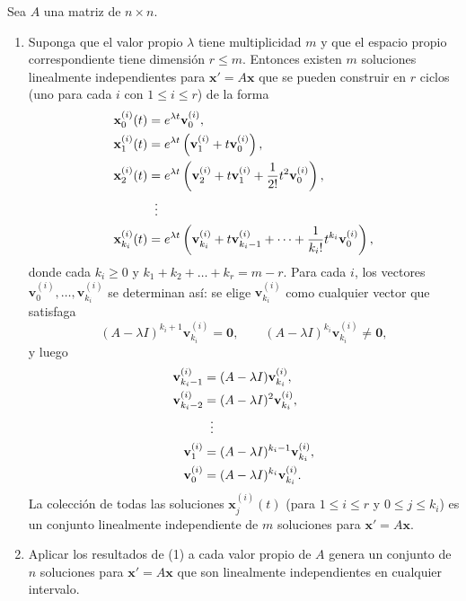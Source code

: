 \begin{theorem}\label{thm:ciclos}
Sea $A$ una matriz de $n \times n$.

\begin{enumerate}
    \item Suponga que el valor propio $\lambda$ tiene multiplicidad $m$ y que el espacio propio correspondiente tiene dimensi\'on $r \le m$. Entonces existen $m$ soluciones linealmente independientes para $\mathbf{x}' = A\mathbf{x}$ que se pueden construir en $r$ ciclos (uno para cada $i$ con $1 \le i \le r$) de la forma
    \begin{align}
    \mathbf{x}_0^{(i)}(t) &= e^{\lambda t}\mathbf{v}_0^{(i)}, \notag \\
    \mathbf{x}_1^{(i)}(t) &= e^{\lambda t}\left(\mathbf{v}_1^{(i)} + t\mathbf{v}_0^{(i)}\right), \notag \\
    \mathbf{x}_2^{(i)}(t) &= e^{\lambda t}\left(\mathbf{v}_2^{(i)} + t\mathbf{v}_1^{(i)} + \frac{1}{2!}t^2\mathbf{v}_0^{(i)}\right), \notag \\
    &\;\;\vdots \notag \\
    \mathbf{x}_{k_i}^{(i)}(t) &= e^{\lambda t}\left(\mathbf{v}_{k_i}^{(i)} + t\mathbf{v}_{k_i - 1}^{(i)} + \dots + \frac{1}{k_i!}t^{k_i}\mathbf{v}_0^{(i)}\right), \label{eq:ciclo-sol}
    \end{align}
    donde cada $k_i \ge 0$ y $k_1 + k_2 + \dots + k_r = m - r$. Para cada $i$, los vectores $\mathbf{v}_0^{(i)}, \dots, \mathbf{v}_{k_i}^{(i)}$ se determinan as\'i: se elige $\mathbf{v}_{k_i}^{(i)}$ como cualquier vector que satisfaga
    \begin{equation}\label{eq:ciclo-cond}
    (A - \lambda I)^{k_i + 1}\mathbf{v}_{k_i}^{(i)} = \mathbf{0}, \qquad (A - \lambda I)^{k_i}\mathbf{v}_{k_i}^{(i)} \neq \mathbf{0},
    \end{equation}
    y luego
    \begin{align}
    \mathbf{v}_{k_i - 1}^{(i)} &= (A - \lambda I)\mathbf{v}_{k_i}^{(i)}, \notag \\
    \mathbf{v}_{k_i - 2}^{(i)} &= (A - \lambda I)^2\mathbf{v}_{k_i}^{(i)}, \notag \\
    &\;\;\vdots \notag \\
    \mathbf{v}_1^{(i)} &= (A - \lambda I)^{k_i - 1}\mathbf{v}_{k_i}^{(i)}, \notag \\
    \mathbf{v}_0^{(i)} &= (A - \lambda I)^{k_i}\mathbf{v}_{k_i}^{(i)}. \notag
    \end{align}
    La colecci\'on de todas las soluciones $\mathbf{x}_j^{(i)}(t)$ (para $1 \le i \le r$ y $0 \le j \le k_i$) es un conjunto linealmente independiente de $m$ soluciones para $\mathbf{x}' = A\mathbf{x}$.

    \item Aplicar los resultados de (1) a cada valor propio de $A$ genera un conjunto de $n$ soluciones para $\mathbf{x}' = A\mathbf{x}$ que son linealmente independientes en cualquier intervalo.
\end{enumerate}
\end{theorem}

